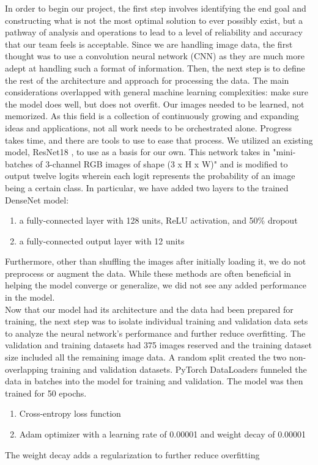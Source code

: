 \documentclass[10pt]{article}
\begin{document}
\indent In order to begin our project, the first step involves identifying the end goal and constructing what is not the most optimal solution to ever possibly exist, but a pathway of analysis and operations to lead to a level of reliability and accuracy that our team feels is acceptable. Since we are handling image data, the first thought was to use a convolution neural network (CNN) as they are much more adept at handling such a format of information. Then, the next step is to define the rest of the architecture and approach for processing the data. The main considerations overlapped with general machine learning complexities: make sure the model does well, but does not overfit. Our images needed to be learned, not memorized. 
\newline
\indent As this field is a collection of continuously growing and expanding ideas and applications, not all work needs to be orchestrated alone. Progress takes time, and there are tools to use to ease that process. We utilized an existing model, ResNet18 \cite{resnet}, to use as a basis for our own. This network takes in "mini-batches of 3-channel RGB images of shape (3 x H x W)" \cite{densenet} and is modified to output twelve logits wherein each logit represents the probability of an image being a certain class. In particular, we have added two layers \cite{ridnik2023mldecoder} to the trained DenseNet model: 
\begin{enumerate}
\item a fully-connected layer with 128 units, ReLU activation, and  50\% dropout
\item a fully-connected output layer with 12 units
\end{enumerate}
\indent Furthermore, other than shuffling the images after initially loading it, we do not preprocess or augment the data. While these methods are often beneficial in helping the model converge or generalize, we did not see any added performance in the model.
\\
\indent Now that our model had its architecture and the data had been prepared for training, the next step was to isolate individual training and validation data sets to analyze the neural network’s performance and further reduce overfitting. The validation and training datasets had 375 images reserved and the training dataset size included all the remaining image data. A random split created the two non-overlapping training and validation datasets. PyTorch DataLoaders funneled the data in batches into the model for training and validation. The model was then trained for 50 epochs.
\begin{enumerate}
\item Cross-entropy loss function
\item Adam optimizer with a learning rate of 0.00001 and weight decay of 0.00001
\end{enumerate}
The weight decay adds a regularization to further reduce overfitting
\end{document}
